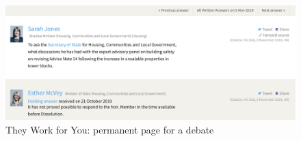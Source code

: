 \begin{figure}[h]
  \centering
  \includegraphics[scale=0.3]{images/they-work-for-you-implementation-permanent-urls-1}
  \caption{They Work for You: permanent page for a debate}
  \label{fig:/they-work-for-you-implementation-permanent-urls-1}
\end{figure}